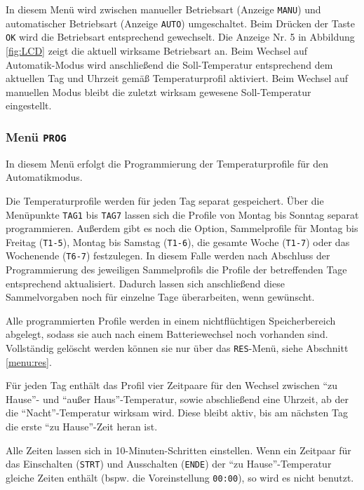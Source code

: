 \documentclass[a5paper]{article}
\begin{document}
In diesem Menü wird zwischen manueller Betriebsart (Anzeige
\texttt{MANU}) und automatischer Betriebsart (Anzeige \texttt{AUTO})
umgeschaltet.  Beim Drücken der Taste \texttt{OK} wird die Betriebsart
entsprechend gewechselt.  Die Anzeige Nr. 5 in Abbildung \ref{fig:LCD} zeigt die
aktuell wirksame Betriebsart an.  Beim Wechsel auf Automatik-Modus
wird anschließend die Soll-Temperatur entsprechend dem aktuellen Tag
und Uhrzeit gemäß Temperaturprofil aktiviert.  Beim Wechsel auf
manuellen Modus bleibt die zuletzt wirksam gewesene Soll-Temperatur
eingestellt.

\subsubsection {
  Menü \texttt{PROG}\label{menu:prog}
}

In diesem Menü erfolgt die Programmierung der Temperaturprofile für
den Automatikmodus.

Die Temperaturprofile werden für jeden Tag separat gespeichert.  Über
die Menüpunkte \texttt{TAG1} bis \texttt{TAG7} lassen sich die Profile
von Montag bis Sonntag separat programmieren.  Außerdem gibt es noch
die Option, Sammelprofile für Montag bis Freitag (\texttt{T1-5}),
Montag bis Samstag (\texttt{T1-6}), die gesamte Woche (\texttt{T1-7})
oder das Wochenende (\texttt{T6-7}) festzulegen.  In diesem Falle
werden nach Abschluss der Programmierung des jeweiligen Sammelprofils
die Profile der betreffenden Tage entsprechend aktualisiert.  Dadurch
lassen sich anschließend diese Sammelvorgaben noch für einzelne Tage
überarbeiten, wenn gewünscht.

Alle programmierten Profile werden in einem nichtflüchtigen
Speicherbereich abgelegt, sodass sie auch nach einem Batteriewechsel
noch vorhanden sind.  Vollständig gelöscht werden können sie nur über
das \texttt{RES}-Menü, siehe Abschnitt \ref{menu:res}.

Für jeden Tag enthält das Profil vier Zeitpaare für den Wechsel
zwischen "`zu Hause"'- und "`außer Haus"'-Temperatur, sowie
abschließend eine Uhrzeit, ab der die "`Nacht"'-Temperatur
wirksam wird.  Diese bleibt aktiv, bis am nächsten Tag die erste
"`zu Hause"'-Zeit heran ist.

Alle Zeiten lassen sich in 10-Minuten-Schritten einstellen.  Wenn ein
Zeitpaar für das Einschalten (\texttt{STRT}) und Ausschalten
(\texttt{ENDE}) der "`zu Hause"'-Temperatur gleiche Zeiten enthält
(bspw. die Voreinstellung \texttt{00:00}), so wird es nicht benutzt.
\end{document}
